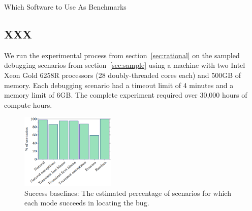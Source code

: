 
 {Which Software to Use As Benchmarks}

\subsection{XXX}
We run the experimental process from section~\ref{sec:rational} on the
sampled debugging scenarios from section~\ref{sec:sample} using a machine with two Intel Xeon Gold 6258R processors (28 doubly-threaded cores each) and 500GB of memory.
Each debugging scenario had a timeout limit of 4 minutes and a
memory limit of 6GB. The complete experiment required
over 30,000 hours of compute hours.


\begin{figure}
  \centering
  \includegraphics[width=0.40\textwidth]{./plots/success-bars}
  \caption{Success baselines: The estimated percentage of scenarios for which each mode succeeds in locating the bug.
  }
  \label{fig:success-bars}
\end{figure}

